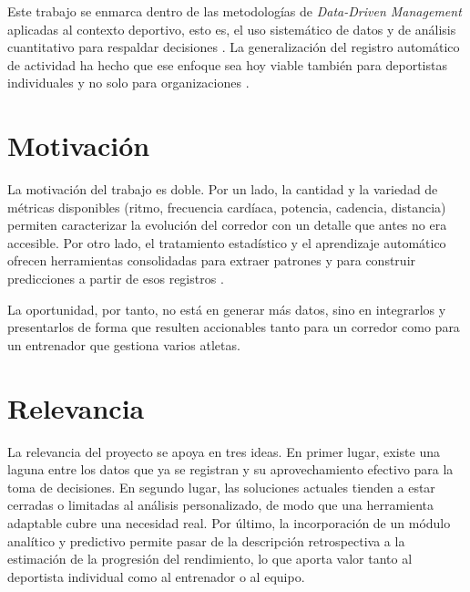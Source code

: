 Este trabajo se enmarca dentro de las metodologías de \emph{Data-Driven
Management} aplicadas al contexto deportivo, esto es, el uso sistemático de
datos y de análisis cuantitativo para respaldar decisiones
\cite{provost2013,davenport2010}. La generalización del registro automático de
actividad ha hecho que ese enfoque sea hoy viable también para deportistas
individuales y no solo para organizaciones \cite{marr2016}.


\section{Motivación}
\label{sec:motivacion}

La motivación del trabajo es doble. Por un lado, la cantidad y la variedad de
métricas disponibles (ritmo, frecuencia cardíaca, potencia, cadencia, distancia)
permiten caracterizar la evolución del corredor con un detalle que antes no era
accesible. Por otro lado, el tratamiento estadístico y el aprendizaje automático
ofrecen herramientas consolidadas para extraer patrones y para construir
predicciones a partir de esos registros \cite{montgomery2018,geron2023}.

La oportunidad, por tanto, no está en generar más datos, sino en integrarlos y
presentarlos de forma que resulten accionables tanto para un corredor como para
un entrenador que gestiona varios atletas.


\section{Relevancia}
\label{sec:relevancia}

La relevancia del proyecto se apoya en tres ideas. En primer lugar, existe una
laguna entre los datos que ya se registran y su aprovechamiento efectivo para la
toma de decisiones. En segundo lugar, las soluciones actuales tienden a estar
cerradas o limitadas al análisis personalizado, de modo que una herramienta
adaptable cubre una necesidad real. Por último, la incorporación de un módulo
analítico y predictivo permite pasar de la descripción retrospectiva a la
estimación de la progresión del rendimiento, lo que aporta valor tanto al
deportista individual como al entrenador o al equipo.


